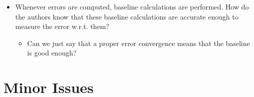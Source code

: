 \documentclass{elsarticle}
\newcommand{\fix}{\textsquare}
\newcommand{\medm}[1]{\textcolor{BurntOrange}{#1}}
\begin{document}
\begin{itemize}
{\begin{tikzpicture}[every node/.style = {font=\normalsize}]
\end{tikzpicture}%
}

\item[\fix] \medm{  Whenever errors are computed, baseline calculations are performed. How do the authors know that these baseline calculations are accurate enough to measure the error w.r.t. them? }
\begin{itemize}
\item Can we just say that a proper error convergence means that the baseline is good enough?
\end{itemize}

\end{itemize}

\section*{Minor Issues}
\end{document}
